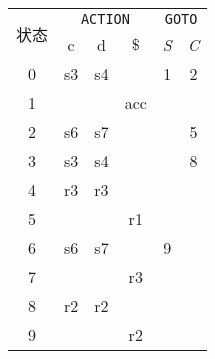 \documentclass[border=1em,varwidth=\maxdimen]{standalone}
\begin{document}
\begin{table}
  \begin{tabular}{cccccc}
    \toprule
    \multirow{2}{*}{状态} & \multicolumn{3}{c}{\texttt{ACTION}} &
                                                                  \multicolumn{2}{c}{\texttt{GOTO}}\\
    \cline{2-6}
                          & c & d & \(\$\) & \textit{S} & \textit{C} \\
    \midrule
    0 & s3 & s4 & & 1 & 2\\
    1 & & & acc & & \\
    2 & s6 & s7 & & & 5\\
    3 & s3 & s4 & & & 8\\
    4 & r3 & r3 & & & \\
    5 & & & r1 & & \\
    6 & s6 & s7 & & 9\\
    7 & & & r3 & & \\
    8 & r2 & r2 & & & \\
    9 & & & r2 & & \\
    \bottomrule
  \end{tabular}
\end{table}
\end{document}
